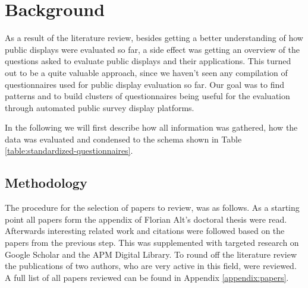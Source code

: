 \section{Background}
\label{sec:questionnaires}


As a result of the literature review, besides getting a better understanding of how public displays were evaluated so far, a side effect was getting an overview of the questions asked to evaluate public displays and their applications. This turned out to be a quite valuable approach, since we haven't seen any compilation of questionnaires used for public display evaluation so far. Our goal was to find patterns and to build clusters of questionnaires being useful for the evaluation through automated public survey display platforms.

In the following we will first describe how all information was gathered, how the data was evaluated and condensed to the schema shown in Table \ref{table:standardized-questionnaires}.





\subsection{Methodology}
\label{sec:questionnaires-methodology}

	The procedure for the selection of papers to review, was as follows. As a starting point all papers form the appendix of Florian Alt's doctoral thesis \cite{alt2013thesis} were read. Afterwards interesting related work and citations were followed based on the papers from the previous step. This was supplemented with targeted research on Google Scholar and the APM Digital Library. To round off the literature review the publications of two authors, who are very active in this field, were reviewed. A full list of all papers reviewed can be found in Appendix \ref{appendix:papers}.

